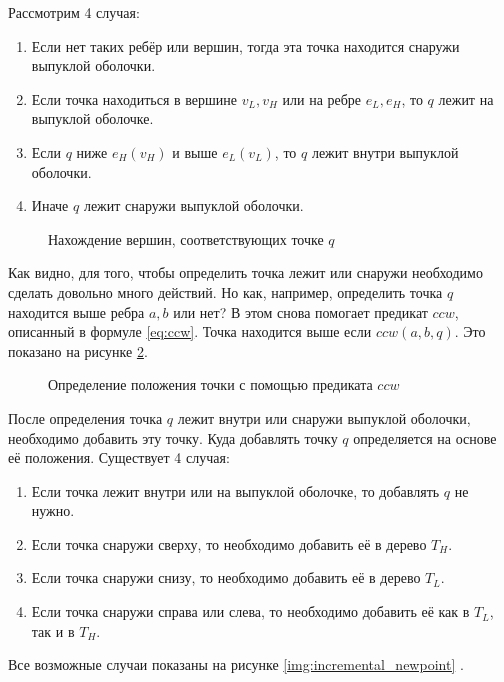 Рассмотрим 4 случая:
\begin{enumerate}
	\item Если нет таких ребёр или вершин, тогда эта точка находится снаружи выпуклой оболочки.
	\item Если точка находиться в вершине $v_L, v_H$ или на ребре $e_L, e_H$, то $q$ лежит на выпуклой оболочке.
	\item Если $q$ ниже $e_H (v_H)$ и выше $e_L (v_L)$, то $q$ лежит внутри выпуклой оболочки.
	\item Иначе $q$ лежит снаружи выпуклой оболочки.
\end{enumerate}

\begin{figure}[H] 
	\centering
	
	\caption{Нахождение вершин, соответствующих точке $q$}
	\label{img:incremental_locate}
\end{figure}

Как видно, для того, чтобы определить точка лежит или снаружи необходимо сделать довольно много действий. Но как, например, определить точка $q$ находится выше ребра $a, b$  или нет? В этом снова помогает предикат $ccw$, описанный в формуле \ref{eq:ccw}. Точка находится выше если $ccw(a, b, q)$. Это показано на рисунке \ref{img:incremental_ccw}.

\begin{figure}[H]
	\centering
	
	\caption{Определение положения точки с помощью предиката $ccw$}
	\label{img:incremental_ccw}
\end{figure}

После определения точка $q$ лежит внутри или снаружи выпуклой оболочки, необходимо добавить эту точку. Куда добавлять точку $q$ определяется на основе её положения. Существует 4 случая:
\begin{enumerate}
	\item Если точка лежит внутри или на выпуклой оболочке, то добавлять $q$ не нужно.
	\item Если точка снаружи сверху, то необходимо добавить её в дерево $T_H$.
	\item Если точка снаружи снизу, то необходимо добавить её в дерево $T_L$.
	\item Если точка снаружи справа или слева, то необходимо добавить её как в $T_L$, так и в $T_H$.
\end{enumerate}

Все возможные случаи показаны на рисунке \ref{img:incremental_newpoint} \cite{instructor2004incremental}.

